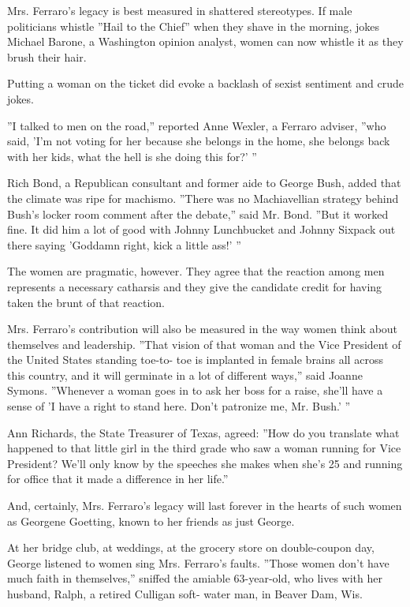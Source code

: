 Mrs. Ferraro's legacy is best measured in shattered stereotypes. If male
politicians whistle ''Hail to the Chief'' when they shave in the
morning, jokes Michael Barone, a Washington opinion analyst, women can
now whistle it as they brush their hair.

Putting a woman on the ticket did evoke a backlash of sexist sentiment
and crude jokes.

''I talked to men on the road,'' reported Anne Wexler, a Ferraro
adviser, ''who said, 'I'm not voting for her because she belongs in the
home, she belongs back with her kids, what the hell is she doing this
for?' ''

Rich Bond, a Republican consultant and former aide to George Bush, added
that the climate was ripe for machismo. ''There was no Machiavellian
strategy behind Bush's locker room comment after the debate,'' said Mr.
Bond. ''But it worked fine. It did him a lot of good with Johnny
Lunchbucket and Johnny Sixpack out there saying 'Goddamn right, kick a
little ass!' ''

The women are pragmatic, however. They agree that the reaction among men
represents a necessary catharsis and they give the candidate credit for
having taken the brunt of that reaction.

Mrs. Ferraro's contribution will also be measured in the way women think
about themselves and leadership. ''That vision of that woman and the
Vice President of the United States standing toe-to- toe is implanted in
female brains all across this country, and it will germinate in a lot of
different ways,'' said Joanne Symons. ''Whenever a woman goes in to ask
her boss for a raise, she'll have a sense of 'I have a right to stand
here. Don't patronize me, Mr. Bush.' ''

Ann Richards, the State Treasurer of Texas, agreed: ''How do you
translate what happened to that little girl in the third grade who saw a
woman running for Vice President? We'll only know by the speeches she
makes when she's 25 and running for office that it made a difference in
her life.''

And, certainly, Mrs. Ferraro's legacy will last forever in the hearts of
such women as Georgene Goetting, known to her friends as just George.

At her bridge club, at weddings, at the grocery store on double-coupon
day, George listened to women sing Mrs. Ferraro's faults. ''Those women
don't have much faith in themselves,'' sniffed the amiable 63-year-old,
who lives with her husband, Ralph, a retired Culligan soft- water man,
in Beaver Dam, Wis.

